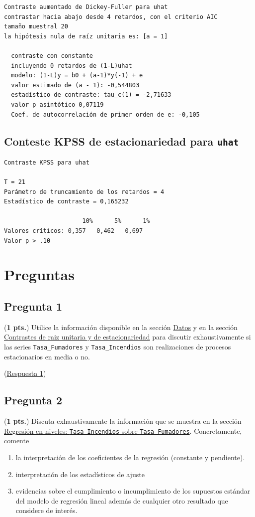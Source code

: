 \documentclass[10pt]{article}
\begin{document}
{\footnotesize
\begin{verbatim}
Contraste aumentado de Dickey-Fuller para uhat
contrastar hacia abajo desde 4 retardos, con el criterio AIC
tamaño muestral 20
la hipótesis nula de raíz unitaria es: [a = 1]

  contraste con constante 
  incluyendo 0 retardos de (1-L)uhat
  modelo: (1-L)y = b0 + (a-1)*y(-1) + e
  valor estimado de (a - 1): -0,544803
  estadístico de contraste: tau_c(1) = -2,71633
  valor p asintótico 0,07119
  Coef. de autocorrelación de primer orden de e: -0,105
\end{verbatim}
}
\subsection*{Conteste KPSS de estacionariedad para \texttt{uhat}}
\label{sec:orgf38f934}

{\footnotesize
\begin{verbatim}
Contraste KPSS para uhat

T = 21
Parámetro de truncamiento de los retardos = 4
Estadístico de contraste = 0,165232

                      10%      5%      1%
Valores críticos: 0,357   0,462   0,697
Valor p > .10
\end{verbatim}
}
\section*{Preguntas}
\label{sec:org2953ca1}

\subsection*{Pregunta 1}
\label{sec:org1044afe}

(\textbf{1 pts.}) Utilice la información disponible en la sección \hyperref[sec:org9eb59b0]{Datos} y en la sección \hyperref[sec:org3ac1b04]{Contrastes de raiz unitaria y de estacionariedad} para discutir exhaustivamente si las series \texttt{Tasa\_Fumadores} y \texttt{Tasa\_Incendios} son realizaciones de procesos estacionarios en media o no.

(\hyperref[sec:org1d836a2]{Respuesta 1})
\subsection*{Pregunta 2}
\label{sec:org2a5c222}

(\textbf{1 pts.}) Discuta exhaustivamente la información que se muestra en la sección \hyperref[sec:org1a45e1f]{Regresión en niveles: \texttt{Tasa\_Incendios} sobre \texttt{Tasa\_Fumadores}}. Concretamente, comente 
\begin{enumerate}
\item la interpretación de los coeficientes de la regresión (constante y pendiente).
\item interpretación de los estadísticos de ajuste
\item evidencias sobre el cumplimiento o incumplimiento de los supuestos estándar del modelo de regresión lineal además de cualquier otro resultado que considere de interés.
\end{enumerate}
\end{document}
